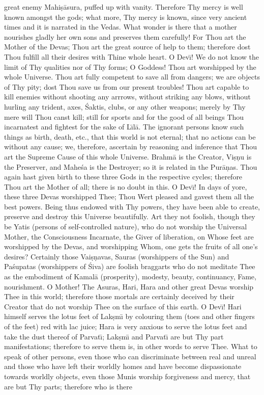 great enemy Mahi\d{s}\=asura, puffed up with vanity. Therefore Thy mercy is well known amongst the gods; what more, Thy mercy is known, since very ancient times and it is narrated in the Vedas. What wonder is there that a mother nourishes gladly her own sons and preserves them carefully! For Thou art the Mother of the Devas; Thou art the great source of help to them; therefore dost Thou fulfill all their desires with Thine whole heart. O Dev\={\i}! We do not know the limit of Thy qualities nor of Thy forms; O Goddess! Thou art worshipped by the whole Universe. Thou art fully competent to save all from dangers; we are objects of Thy pity; dost Thou save us from our present troubles! Thou art capable to kill enemies without shooting any arrrows, without striking any blows, without hurling any trident, axes, \'Saktis, clubs, or any other weapons; merely by Thy mere will Thou canst kill; still for sports and for the good of all beings Thou incarnatest and fightest for the sake of L\={\i}l\=a. The ignorant persons know such things as birth, death, etc., that this world is not eternal; that no actions can be without any cause; we, therefore, ascertain by reasoning and inference that Thou art the Supreme Cause of this whole Universe. Brahm\=a is the Creator, Vi\d{s}\d{n}u is the Preserver, and Mahe\'sa is the Destroyer; so it is related in the Pur\=a\d{n}as. Thou again hast given birth to these three Gods in the respective cycles; therefore Thou art the Mother of all; there is no doubt in this. O Dev\={\i}! In days of yore, these three Devas worshipped Thee; Thou Wert pleased and gavest them all the best powers. Being thus endowed with Thy powers, they have been able to create, preserve and destroy this Universe beautifully. Art they not foolish, though they be Yatis (persons of self-controlled nature), who do not worship the Universal Mother, the Consciousness Incarnate, the Giver of liberation, on Whose feet are worshipped by the Devas, and worshipping Whom, one gets the fruits of all one's desires? Certainly those Vai\d{s}\d{n}avas, Sauras (worshippers of the Sun) and Pa\'supatas (worshippers of \'Siva) are foolish braggarts who do not meditate Thee as the embodiment of Kamal\=a (prosperity), modesty, beauty, continuancy, Fame, nourishment. O Mother! The Asuras, Hari, Hara and other great Devas worship Thee in this world; therefore those mortals are certainly deceived by their Creator that do not worship Thee on the surface of this earth. O Dev\={\i}! Hari himself serves the lotus feet of Lak\d{s}m\={\i} by colouring them (toes and other fingers of the feet) red with lac juice; Hara is very anxious to serve the lotus feet and take the dust thereof of Parvat\={\i}; Lak\d{s}m\={\i} and Parvat\={\i} are but Thy part manifestations; therefore to serve them is, in other words to serve Thee. What to speak of other persons, even those who can discriminate between real and unreal and those who have left their worldly homes and have become dispassionate towards worldly objects, even those Munis worship forgiveness and mercy, that are but Thy parts; therefore who is there


